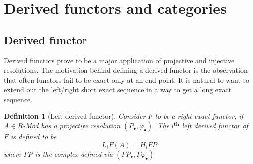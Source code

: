 \documentclass[12pt]{article}
\numberwithin{equation}{section}
\newtheorem{definition}{Definition}[section]
\begin{document}
	\section{Derived functors and categories}
	
	
	\subsection{Derived functor}
	Derived functors prove to be a major application of projective and injective resolutions. The motivation behind defining a derived functor is the observation that often functors fail to be exact only at an end point. It is natural to want to extend out the left/right short exact sequence in a way to get a long exact sequence.
	\begin{definition}[Left derived functor]
		Consider $F$ to be a right exact functor, if $A \in R$-Mod has a projective resolution $(P_\bullet, \varphi_\bullet)$. The $i^\textbf{th}$ left derived functor of $F$ is defined to be \[ L_iF(A)=H_i FP \] where $FP$ is the complex defined via $(FP_\bullet,F\varphi_\bullet)$
		\end{definition}
		
\end{document}
